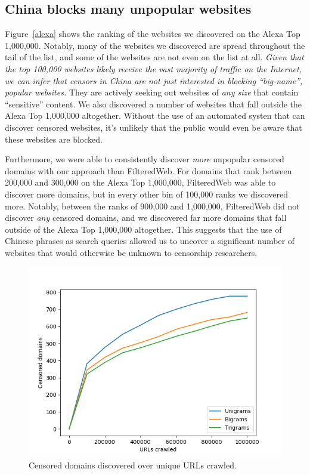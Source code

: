 \subsection{China blocks many unpopular websites}
Figure~\ref{alexa} shows the ranking of the websites we discovered on
the Alexa Top 1,000,000. Notably, many of the websites we discovered
are spread throughout the tail of the list, and some of the websites
are not even on the list at all. \textit{Given that the top 100,000 websites
likely receive the vast majority of traffic on the Internet, we can
infer that censors in China are not just interested in blocking
``big-name'', popular websites.} They are actively seeking out websites
of \textit{any size} that contain ``sensitive'' content. We also
discovered a number of websites that fall outside the Alexa Top
1,000,000 altogether. Without the use of an automated systen that can
discover censored websites, it's unlikely that the public would even
be aware that these websites are blocked.

Furthermore, we were able to consistently discover \textit{more} unpopular
censored domains with our approach than FilteredWeb. For domains that
rank between 200,000 and 300,000 on the Alexa Top 1,000,000,
FilteredWeb was able to discover more domains, but in every other bin of
100,000 ranks we discovered more. Notably, between the ranks of 900,000
and 1,000,000, FilteredWeb did not discover \textit{any} censored domains, and
we discovered far more domains that fall outside of the Alexa Top
1,000,000 altogether. This suggests that the use of Chinese phrases
as search queries allowed us to uncover a significant number of
websites that would otherwise be unknown to censorship researchers.

\begin{figure}[t]
  \centering
  \includegraphics[scale=0.5]{figures/urls-crawled}
  \caption{\label{censored-vs-urls} Censored domains discovered over unique URLs crawled. }
\end{figure}

